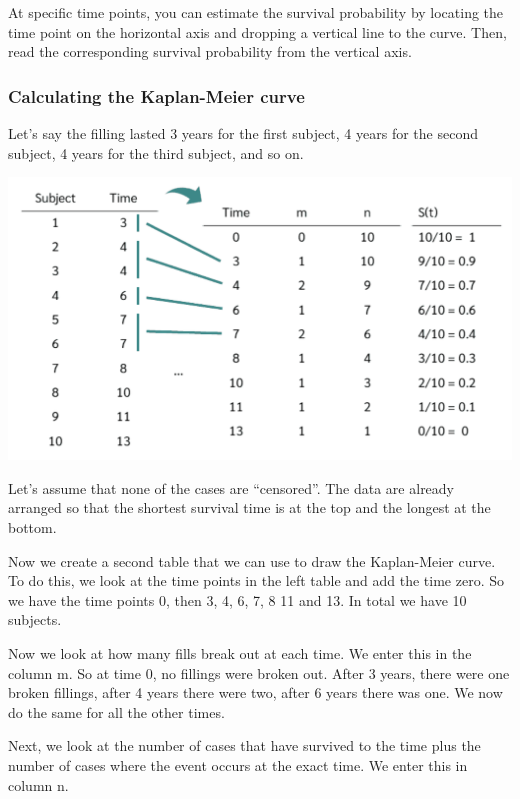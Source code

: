 \documentclass[
]{book}
\begin{document}
At specific time points, you can estimate the survival probability by locating the time point on the horizontal axis and dropping a vertical line to the curve. Then, read the corresponding survival probability from the vertical axis.

\hypertarget{calculating-the-kaplan-meier-curve}{%
\subsubsection{Calculating the Kaplan-Meier curve}\label{calculating-the-kaplan-meier-curve}}

Let's say the filling lasted 3 years for the first subject, 4 years for the second subject, 4 years for the third subject, and so on.

\includegraphics{figs/km0.png}

Let's assume that none of the cases are ``censored''. The data are already arranged so that the shortest survival time is at the top and the longest at the bottom.

Now we create a second table that we can use to draw the Kaplan-Meier curve. To do this, we look at the time points in the left table and add the time zero. So we have the time points 0, then 3, 4, 6, 7, 8 11 and 13. In total we have 10 subjects.

Now we look at how many fills break out at each time. We enter this in the column m. So at time 0, no fillings were broken out. After 3 years, there were one broken fillings, after 4 years there were two, after 6 years there was one. We now do the same for all the other times.

Next, we look at the number of cases that have survived to the time plus the number of cases where the event occurs at the exact time. We enter this in column n.
\end{document}
